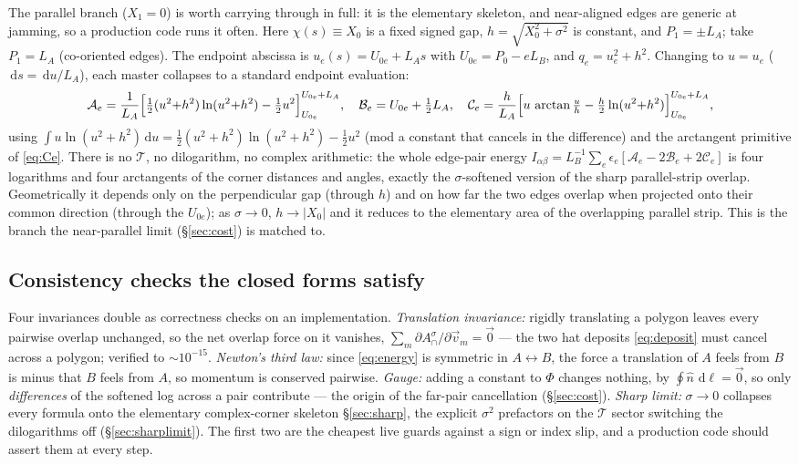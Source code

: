 \documentclass[11pt]{article}
\newcommand{\atan}{\operatorname{arctan}}
\newcommand{\dd}{\,\mathrm{d}}
\newcommand{\Acap}{A^{\sigma}_{\cap}}
\begin{document}
The parallel branch ($X_1=0$) is worth carrying through in full: it is the elementary
skeleton, and near-aligned edges are generic at jamming, so a production code runs it
often.  Here $\chi(s)\equiv X_0$ is a fixed signed gap, $h=\sqrt{X_0^2+\sigma^2}$ is
constant, and $P_1=\pm L_A$; take $P_1=L_A$ (co-oriented edges).  The endpoint abscissa
is $u_e(s)=U_{0e}+L_As$ with $U_{0e}=P_0-eL_B$, and $q_e=u_e^2+h^2$.  Changing to
$u=u_e$ ($\dd s=\dd u/L_A$), each master collapses to a standard endpoint evaluation:
\[
  \mathcal A_e=\frac{1}{L_A}\Bigl[\tfrac12(u^2{+}h^2)\ln(u^2{+}h^2)-\tfrac12 u^2
     \Bigr]_{U_{0e}}^{U_{0e}+L_A},\quad
  \mathcal B_e=U_{0e}+\tfrac12 L_A,\quad
  \mathcal C_e=\frac{h}{L_A}\Bigl[u\,\atan\tfrac{u}{h}-\tfrac{h}{2}\ln(u^2{+}h^2)
     \Bigr]_{U_{0e}}^{U_{0e}+L_A},
\]
using $\int u\ln(u^2{+}h^2)\dd u=\tfrac12(u^2{+}h^2)\ln(u^2{+}h^2)-\tfrac12 u^2$ (mod a
constant that cancels in the difference) and the arctangent primitive of
\eqref{eq:Ce}.  There is no $\mathcal T$, no dilogarithm, no complex arithmetic: the
whole edge-pair energy
$I_{\alpha\beta}=L_B^{-1}\sum_e\epsilon_e[\mathcal A_e-2\mathcal B_e+2\mathcal C_e]$
is four logarithms and four arctangents of the corner distances and angles, exactly
the $\sigma$-softened version of the sharp parallel-strip overlap.  Geometrically it
depends only on the perpendicular gap (through $h$) and on how far the two edges
overlap when projected onto their common direction (through the $U_{0e}$); as
$\sigma\to0$, $h\to|X_0|$ and it reduces to the elementary area of the overlapping
parallel strip.  This is the branch the near-parallel limit (\S\ref{sec:cost}) is
matched to.

\subsection{Consistency checks the closed forms satisfy}
\label{sec:checks}

Four invariances double as correctness checks on an implementation.
\emph{Translation invariance:} rigidly translating a polygon leaves every pairwise
overlap unchanged, so the net overlap force on it vanishes,
$\sum_m\partial\Acap/\partial\vec v_m=\vec0$ --- the two hat deposits \eqref{eq:deposit}
must cancel across a polygon; verified to $\sim10^{-15}$.  \emph{Newton's third law:}
since \eqref{eq:energy} is symmetric in $A\leftrightarrow B$, the force a translation of
$A$ feels from $B$ is minus that $B$ feels from $A$, so momentum is conserved pairwise.
\emph{Gauge:} adding a constant to $\Phi$ changes nothing, by
$\oint\hat n\,\dd\ell=\vec0$, so only \emph{differences} of the softened log across a
pair contribute --- the origin of the far-pair cancellation (\S\ref{sec:cost}).
\emph{Sharp limit:} $\sigma\to0$ collapses every formula onto the elementary
complex-corner skeleton \S\ref{sec:sharp}, the explicit $\sigma^2$ prefactors on the
$\mathcal T$ sector switching the dilogarithms off (\S\ref{sec:sharplimit}).  The first
two are the cheapest live guards against a sign or index slip, and a production code
should assert them at every step.
\end{document}
